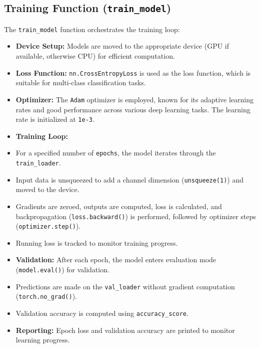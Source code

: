 \documentclass[a4paper]{article}
\begin{document}
\begin{multicols}{2}
\subsection{Training Function (\texttt{train\_model})}
The \texttt{train\_model} function orchestrates the training loop:
\begin{itemize}
    \item \textbf{Device Setup:} Models are moved to the appropriate device (GPU if available, otherwise CPU) for efficient computation.
    \item \textbf{Loss Function:} \texttt{nn.CrossEntropyLoss} is used as the loss function, which is suitable for multi-class classification tasks.
    \item \textbf{Optimizer:} The \texttt{Adam} optimizer is employed, known for its adaptive learning rates and good performance across various deep learning tasks. The learning rate is initialized at \texttt{1e-3}.
    \item \textbf{Training Loop:}
        \item For a specified number of \texttt{epochs}, the model iterates through the \texttt{train\_loader}.
        \item Input data is unsqueezed to add a channel dimension (\texttt{unsqueeze(1)}) and moved to the device.
        \item Gradients are zeroed, outputs are computed, loss is calculated, and backpropagation (\texttt{loss.backward()}) is performed, followed by optimizer steps (\texttt{optimizer.step()}).
        \item Running loss is tracked to monitor training progress.
    \item \textbf{Validation:} After each epoch, the model enters evaluation mode (\texttt{model.eval()}) for validation.
        \item Predictions are made on the \texttt{val\_loader} without gradient computation (\texttt{torch.no\_grad()}).
        \item Validation accuracy is computed using \texttt{accuracy\_score}.
    \item \textbf{Reporting:} Epoch loss and validation accuracy are printed to monitor learning progress.
\end{itemize}


\end{multicols}
\end{document}
